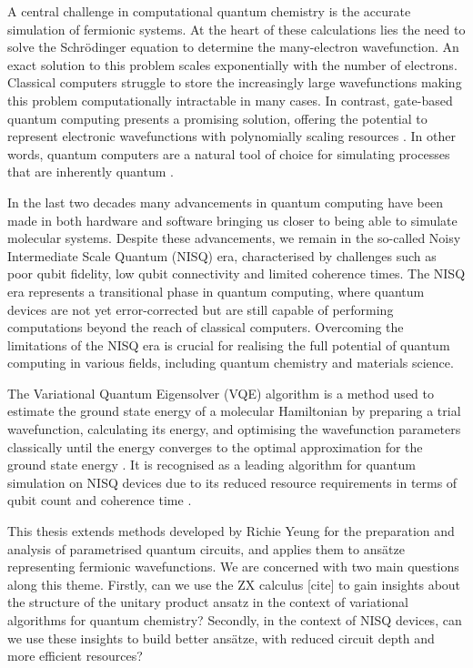 A central challenge in computational quantum chemistry is the accurate simulation of fermionic systems. At the heart of these calculations lies the need to solve the Schrödinger equation to determine the many-electron wavefunction. An exact solution to this problem scales exponentially with the number of electrons. Classical computers struggle to store the increasingly large wavefunctions making this problem computationally intractable in many cases. In contrast, gate-based quantum computing presents a promising solution, offering the potential to represent electronic wavefunctions with polynomially scaling resources \cite{Burton2023}. In other words, quantum computers are a natural tool of choice for simulating processes that are inherently quantum \cite{Yeung2020}.

In the last two decades many advancements in quantum computing have been made in both hardware and software bringing us closer to being able to simulate molecular systems. Despite these advancements, we remain in the so-called Noisy Intermediate Scale Quantum (NISQ) era, characterised by challenges such as poor qubit fidelity, low qubit connectivity and limited coherence times. The NISQ era represents a transitional phase in quantum computing, where quantum devices are not yet error-corrected but are still capable of performing computations beyond the reach of classical computers. Overcoming the limitations of the NISQ era is crucial for realising the full potential of quantum computing in various fields, including quantum chemistry and materials science.

The Variational Quantum Eigensolver (VQE) algorithm is a method used to estimate the ground state energy of a molecular Hamiltonian by preparing a trial wavefunction, calculating its energy, and optimising the wavefunction parameters classically until the energy converges to the optimal approximation for the ground state energy \cite{McClean2016}. It is recognised as a leading algorithm for quantum simulation on NISQ devices due to its reduced resource requirements in terms of qubit count and coherence time \cite{Kirby2020}.

This thesis extends methods developed by Richie Yeung \cite{Yeung2020} for the preparation and analysis of parametrised quantum circuits, and applies them to ansätze representing fermionic wavefunctions. We are concerned with two main questions along this theme. Firstly, can we use the ZX calculus [cite] to gain insights about the structure of the unitary product ansatz in the context of variational algorithms for quantum chemistry? Secondly, in the context of NISQ devices, can we use these insights to build better ansätze, with reduced circuit depth and more efficient resources?

